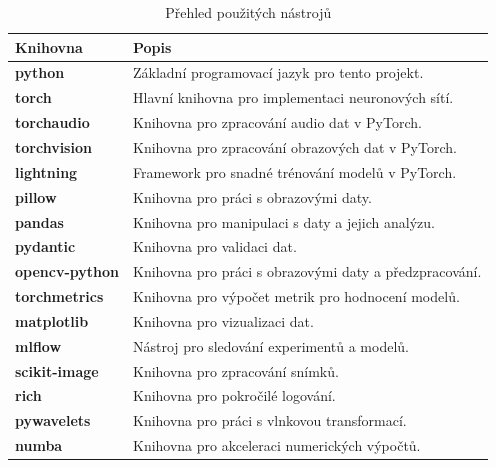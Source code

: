 \documentclass[male,czech,api_ing]{thesis}
\begin{document}
\begin{table}[h]
    \centering
    \begin{tabular}{|l|l|}
    \hline
    \textbf{Knihovna}       & \textbf{Popis}                                          \\ \hline
    \textbf{python}         & Základní programovací jazyk pro tento projekt.          \\ \hline
    \textbf{torch}          & Hlavní knihovna pro implementaci neuronových sítí.      \\ \hline
    \textbf{torchaudio}     & Knihovna pro zpracování audio dat v PyTorch.            \\ \hline
    \textbf{torchvision}    & Knihovna pro zpracování obrazových dat v PyTorch.       \\ \hline
    \textbf{lightning}      & Framework pro snadné trénování modelů v PyTorch.        \\ \hline
    \textbf{pillow}         & Knihovna pro práci s obrazovými daty.                   \\ \hline
    \textbf{pandas}         & Knihovna pro manipulaci s daty a jejich analýzu.        \\ \hline
    \textbf{pydantic}       & Knihovna pro validaci dat.                              \\ \hline
    \textbf{opencv-python}  & Knihovna pro práci s obrazovými daty a předzpracování.  \\ \hline
    \textbf{torchmetrics}   & Knihovna pro výpočet metrik pro hodnocení modelů.       \\ \hline
    \textbf{matplotlib}     & Knihovna pro vizualizaci dat.                           \\ \hline
    \textbf{mlflow}         & Nástroj pro sledování experimentů a modelů.             \\ \hline
    \textbf{scikit-image}   & Knihovna pro zpracování snímků.                         \\ \hline
    \textbf{rich}           & Knihovna pro pokročilé logování.                        \\ \hline
    \textbf{pywavelets}     & Knihovna pro práci s vlnkovou transformací.             \\ \hline
    \textbf{numba}          & Knihovna pro akceleraci numerických výpočtů.            \\ \hline
    \end{tabular}
    \caption{Přehled použitých nástrojů}
    \label{tab:Used_libs}
\end{table}
\end{document}
